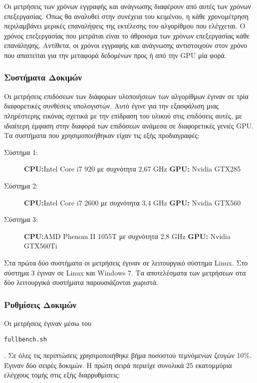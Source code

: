 Οι μετρήσεις των χρόνων εγγραφής και ανάγνωσης διαφέρουν από αυτές των χρόνων επεξεργασίας. Όπως θα αναλυθεί στην συνέχεια του κειμένου, η κάθε χρονομέτρηση περιλαμβάνει μερικές επαναλήψεις της εκτέλεσης του αλγορίθμου που ελέγχεται. Ο χρόνος επεξεργασίας που μετράται είναι το άθροισμα των χρόνων επεξεργασίας κάθε επανάληψης. Αντίθετα, οι χρόνοι εγγραφής και ανάγνωσης αντιστοιχούν στον χρόνο που απαιτείται για την μεταφορά δεδομένων προς ή από την GPU μία φορά.   

\subsubsection*{Συστήματα Δοκιμών}

Οι μετρήσεις επιδόσεων των διάφορων υλοποιήσεων των αλγορίθμων έγιναν σε τρία διαφορετικές συνθέσεις υπολογιστών. Αυτό έγινε για την εξασφάλιση μιας πληρέστερης εικόνας σχετικά με την επίδραση του υλικού στις επιδόσεις αυτές, με ιδιαίτερη έμφαση στην διαφορά των επιδόσεων ανάμεσα σε διαφορετικές γενιές GPU. Τα συστήματα που χρησιμοποιήθηκαν είχαν τις εξής προδιαγραφές:

\begin{description}
  \item[Σύστημα 1:]\textbf{CPU:}Intel Core i7 920 με συχνότητα 2,67 GHz \textbf{GPU:} Nvidia GTX285 %
  \item[Σύστημα 2:]\textbf{CPU:}Intel Core i7 2600 με συχνότητα 3,4 GHz \textbf{GPU:} Nvidia GTX560 %
  \item[Σύστημα 3:]\textbf{CPU:}AMD Phenom II 1055T με συχνότητα 2,8 GHz \textbf{GPU:} Nvidia GTX560Ti %
\end{description}

Στα πρώτα δύο συστήματα οι μετρήσεις έγιναν σε λειτουργικό σύστημα Linux. Στο σύστημα 3 έγιναν σε Linux και Windows 7. Τα αποτελέσματα των μετρήσεων στα δύο λειτουργικά συστήματα παρουσιάζονται χωριστά.

\subsubsection*{Ρυθμίσεις Δοκιμών}

Οι μετρήσεις έγιναν μέσω του \begin{english}\verb!fullbench.sh!\end{english}. Σε όλες τις περιπτώσεις χρησιμοποιήθηκε βήμα ποσοστού τεμνόμενων ζευγών 10\%. Έγιναν δύο σειρές δοκιμών. Η πρώτη σειρά περιείχε συνολικά 25 εκατομμύρια ελέγχους τομής στις εξής διαρρυθμίσεις:

